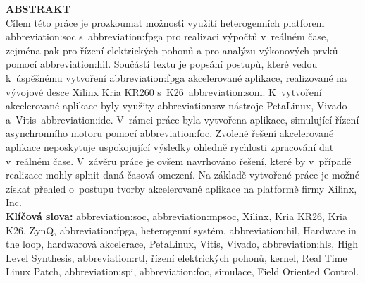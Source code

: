 \documentclass[a4paper, twoside, 11pt]{article}
\begin{document}
\newpage
\begin{minipage}[t]{7.37cm}
	\textcolor{ctublue}{\Large{\textbf{\MakeTextUppercase{Abstrakt}}}}\\
	Cílem této práce je prozkoumat možnosti využití heterogenních platforem \gls{abbreviation:soc} s~\gls{abbreviation:fpga} pro realizaci výpočtů v~reálném čase, zejména pak pro řízení elektrických pohonů a pro analýzu výkonových prvků pomocí \gls{abbreviation:hil}. Součástí textu je popsání postupů, které vedou k~úspěšnému vytvoření \gls{abbreviation:fpga} akcelerované aplikace, realizované na vývojové desce Xilinx Kria KR260 s~K26~\gls{abbreviation:som}. K~vytvoření akcelerované aplikace byly využity \gls{abbreviation:sw} nástroje PetaLinux, Vivado a~Vitis~\gls{abbreviation:ide}. V~rámci práce byla vytvořena aplikace, simulující řízení asynchronního motoru pomocí \gls{abbreviation:foc}. Zvolené řešení akcelerované aplikace neposkytuje uspokojující výsledky ohledně rychlosti zpracování dat v~reálném čase. V~závěru práce je ovšem navrhováno řešení, které by v~případě realizace mohly splnit daná časová omezení. Na základě vytvořené práce je možné získat přehled o~postupu tvorby akcelerované aplikace na platformě firmy Xilinx, Inc.\\
	\textbf{Klíčová slova:} \gls{abbreviation:soc}, \gls{abbreviation:mpsoc}, Xilinx, Kria KR26, Kria K26, ZynQ, \gls{abbreviation:fpga}, heterogenní systém, \gls{abbreviation:hil}, Hardware in the loop, hardwarová akcelerace, PetaLinux, Vitis, Vivado, \gls{abbreviation:hls}, High Level Synthesis, \gls{abbreviation:rtl}, řízení elektrických pohonů, kernel, Real Time Linux Patch, \gls{abbreviation:spi}, \gls{abbreviation:foc}, simulace, Field Oriented Control.
\end{minipage}%
\hfill%
\end{document}
